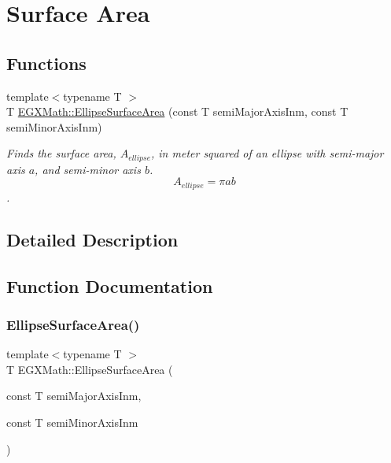 \hypertarget{group___e_g_x_math-_geometry-2_d-_ellipse-_surface_area}{}\section{Surface Area}
\label{group___e_g_x_math-_geometry-2_d-_ellipse-_surface_area}
\subsection*{Functions}
\begin{DoxyCompactItemize}
\item 
{\footnotesize template$<$typename T $>$ }\\T \mbox{\hyperlink{group___e_g_x_math-_geometry-2_d-_ellipse-_surface_area_ga4ce8c8323e9718ce5458f4ab7f6d823d}{E\+G\+X\+Math\+::\+Ellipse\+Surface\+Area}} (const T semi\+Major\+Axis\+Inm, const T semi\+Minor\+Axis\+Inm)
\begin{DoxyCompactList}\small\item\em Finds the surface area, $A_{ellipse}$, in meter squared of an ellipse with semi-\/major axis $a$, and semi-\/minor axis $b$. \[ A_{ellipse}=\pi a b \]. \end{DoxyCompactList}\end{DoxyCompactItemize}


\subsection{Detailed Description}


\subsection{Function Documentation}
\mbox{\label{group___e_g_x_math-_geometry-2_d-_ellipse-_surface_area_ga4ce8c8323e9718ce5458f4ab7f6d823d}} 
\subsubsection{\texorpdfstring{Ellipse\+Surface\+Area()}{EllipseSurfaceArea()}}
{\footnotesize\ttfamily template$<$typename T $>$ \\
T E\+G\+X\+Math\+::\+Ellipse\+Surface\+Area (\begin{DoxyParamCaption}\item[{const T}]{semi\+Major\+Axis\+Inm,  }\item[{const T}]{semi\+Minor\+Axis\+Inm }\end{DoxyParamCaption})}



